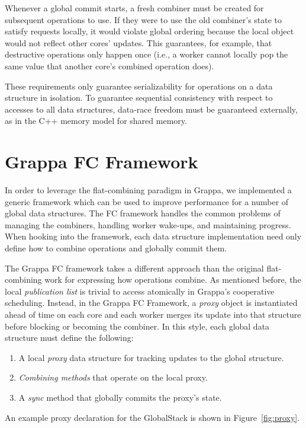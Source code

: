 Whenever a global commit starts, a fresh combiner must be created for subsequent operations to use. If they were to use the old combiner's state to satisfy requests locally, it would violate global ordering because the local object would not reflect other cores' updates. This guarantees, for example, that destructive operations only happen once (i.e., a worker cannot locally pop the same value that another core's combined operation does).

These requirements only guarantee serializability for operations on a data structure in isolation. To guarantee sequential consistency with respect to accesses to all data structures, data-race freedom  must be guaranteed externally, as in the C++ memory model for shared memory.

\section{Grappa FC Framework}
In order to leverage the flat-combining paradigm in Grappa, we implemented a generic framework which can be used to improve performance for a number of global data structures. The FC framework handles the common problems of managing the combiners, handling worker wake-ups, and maintaining progress. When hooking into the framework, each data structure implementation need only define how to combine operations and globally commit them.

The Grappa FC framework takes a different approach than the original flat-combining work for expressing how operations combine. As mentioned before, the local \emph{publication list} is trivial to access atomically in Grappa's cooperative scheduling.
Instead, in the Grappa FC Framework, a \emph{proxy} object is instantiated ahead of time on each core and each worker merges its update into that structure before blocking or becoming the combiner.
In this style, each global data structure must define the following:
\begin{enumerate}
  \item A local \emph{proxy} data structure for tracking updates to the global structure.
  \item \emph{Combining methods} that operate on the local proxy.
  \item A \emph{sync} method that globally commits the proxy's state.
\end{enumerate}
An example proxy declaration for the GlobalStack is shown in Figure~\ref{fig:proxy}.

